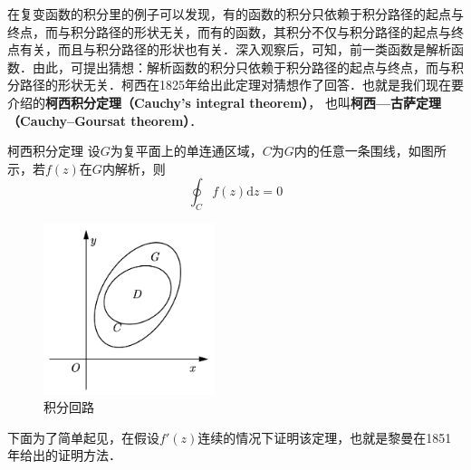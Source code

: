 


在复变函数的积分里的例子可以发现，有的函数的积分只依赖于积分路径的起点与终点，而与积分路径的形状无关，而有的函数，其积分不仅与积分路径的起点与终点有关，而且与积分路径的形状也有关．深入观察后，可知，前一类函数是解析函数．由此，可提出猜想：解析函数的积分只依赖于积分路径的起点与终点，而与积分路径的形状无关．柯西在1825年给出此定理对猜想作了回答．也就是我们现在要介绍的\textbf{柯西积分定理（Cauchy's integral theorem）}， 也叫\textbf{柯西—古萨定理（Cauchy–Goursat theorem）}．

\begin{theorem}{柯西积分定理}
设$G $为复平面上的单连通区域，$C $为$G $内的任意一条围线，如图所示，若$f (z)$在$G $内解析，则
\begin{equation}
\oint_{C} f(z) \mathrm{d} z=0
\end{equation}
\begin{figure}[ht]
\centering
\includegraphics[width=5cm]{./figures/CauGou_1.pdf}
\caption{积分回路} \label{CauGou_fig1}
\end{figure}

下面为了简单起见，在假设$f'(z)$连续的情况下证明该定理，也就是黎曼在1851年给出的证明方法．


\end{theorem}
